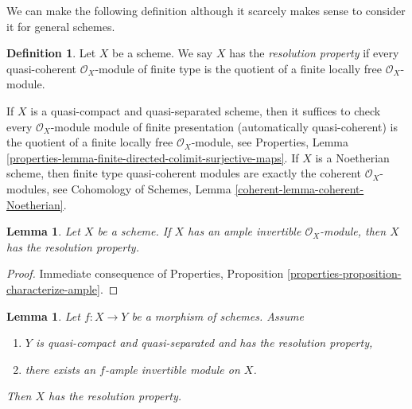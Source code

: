 \documentclass{stacks-project}
\theoremstyle{plain}
\newtheorem{lemma}[subsection]{Lemma}
\theoremstyle{definition}
\newtheorem{definition}[subsection]{Definition}
\theoremstyle{remark}
\numberwithin{equation}{subsection}
\begin{document}
\medskip\noindent
We can make the following definition although it scarcely makes
sense to consider it for general schemes.

\begin{definition}
\label{definition-resolution-property}
Let $X$ be a scheme. We say $X$ has the {\it resolution property}
if every quasi-coherent $\mathcal{O}_X$-module of finite type
is the quotient of a finite locally free $\mathcal{O}_X$-module.
\end{definition}

\noindent
If $X$ is a quasi-compact and quasi-separated scheme, then it suffices to check
every $\mathcal{O}_X$-module module of finite presentation (automatically
quasi-coherent) is the quotient of a finite locally free
$\mathcal{O}_X$-module, see Properties, Lemma
\ref{properties-lemma-finite-directed-colimit-surjective-maps}.
If $X$ is a Noetherian scheme, then finite type quasi-coherent modules
are exactly the coherent $\mathcal{O}_X$-modules, see
Cohomology of Schemes, Lemma \ref{coherent-lemma-coherent-Noetherian}.

\begin{lemma}
\label{lemma-resolution-property-ample}
Let $X$ be a scheme. If $X$ has an ample invertible $\mathcal{O}_X$-module,
then $X$ has the resolution property.
\end{lemma}

\begin{proof}
Immediate consequence of Properties, Proposition
\ref{properties-proposition-characterize-ample}.
\end{proof}

\begin{lemma}
\label{lemma-resolution-property-ample-relative}
Let $f : X \to Y$ be a morphism of schemes. Assume
\begin{enumerate}
\item $Y$ is quasi-compact and quasi-separated and has the resolution property,
\item there exists an $f$-ample invertible module on $X$.
\end{enumerate}
Then $X$ has the resolution property.
\end{lemma}
\end{document}

